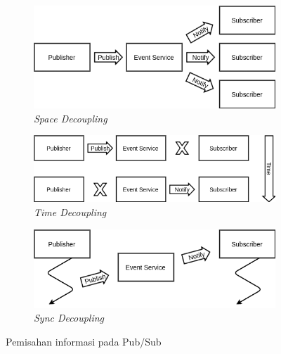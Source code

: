 \begin{figure}[!]
	\centering
	\begin{subfigure}[t]{9cm}
		\centering
		\includegraphics[width=\textwidth]{Resources/Images/space-decoupling}
		\caption{\textit{Space Decoupling}}
		\label{fig:space-decoupling}
	\end{subfigure}%
	
	\begin{subfigure}[t]{10cm}
		\centering
		\includegraphics[width=\textwidth]{Resources/Images/time-decoupling}
		\caption{\textit{Time Decoupling}}
		\label{fig:time-decoupling}
	\end{subfigure}%
	
	\begin{subfigure}[t]{9cm}
		\centering
		\includegraphics[width=\textwidth]{Resources/Images/sync-decoupling}
		\caption{\textit{Sync Decoupling}}
		\label{fig:sync-decoupling}
	\end{subfigure}
	\captionsetup{format=hang}
	\caption{Pemisahan informasi pada Pub/Sub \citep{eugster_many_2003}}
	\label{fig:space-time-sync-decoupling}
\end{figure}
